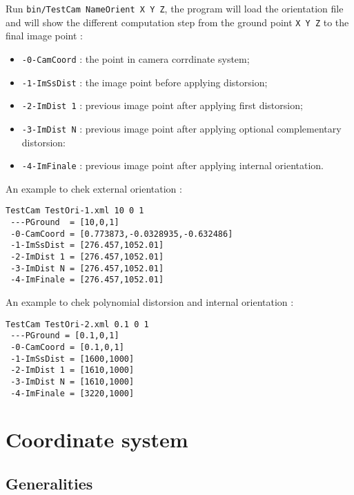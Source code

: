 Run {\tt bin/TestCam NameOrient X Y Z},  the program will load the
orientation file and will show the different computation step from
the ground point {\tt X Y Z} to the final image point :


\begin{itemize}
   \item  {\tt -0-CamCoord} : the point in camera corrdinate system;
   \item  {\tt -1-ImSsDist} : the image point before applying distorsion;
   \item  {\tt -2-ImDist 1} : previous image point after applying first distorsion;
   \item  {\tt -3-ImDist N} : previous image point after applying optional complementary distorsion:
   \item  {\tt -4-ImFinale} : previous image point after applying internal orientation.
\end{itemize}

An example  to chek external orientation :

\begin{verbatim}
TestCam TestOri-1.xml 10 0 1
 ---PGround  = [10,0,1]
 -0-CamCoord = [0.773873,-0.0328935,-0.632486]
 -1-ImSsDist = [276.457,1052.01]
 -2-ImDist 1 = [276.457,1052.01]
 -3-ImDist N = [276.457,1052.01]
 -4-ImFinale = [276.457,1052.01]
\end{verbatim}


An example  to chek polynomial distorsion and internal orientation :

\begin{verbatim}
TestCam TestOri-2.xml 0.1 0 1
 ---PGround = [0.1,0,1]
 -0-CamCoord = [0.1,0,1]
 -1-ImSsDist = [1600,1000]
 -2-ImDist 1 = [1610,1000]
 -3-ImDist N = [1610,1000]
 -4-ImFinale = [3220,1000]
\end{verbatim}



\section{Coordinate system}

\label{Coordinat:System}


\subsection{Generalities}

